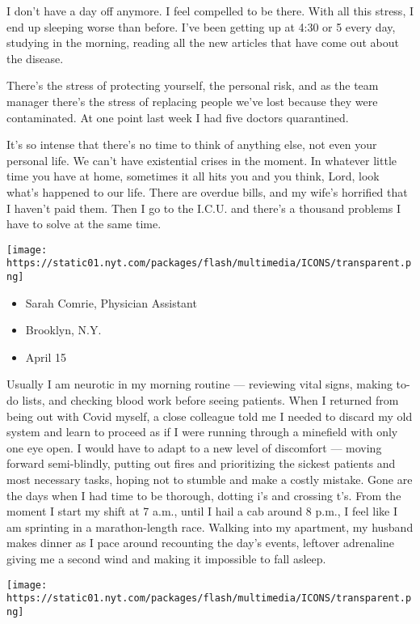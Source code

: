 I don't have a day off anymore. I feel compelled to be there. With all
this stress, I end up sleeping worse than before. I've been getting up
at 4:30 or 5 every day, studying in the morning, reading all the new
articles that have come out about the disease.

There's the stress of protecting yourself, the personal risk, and as the
team manager there's the stress of replacing people we've lost because
they were contaminated. At one point last week I had five doctors
quarantined.

It's so intense that there's no time to think of anything else, not even
your personal life. We can't have existential crises in the moment. In
whatever little time you have at home, sometimes it all hits you and you
think, Lord, look what's happened to our life. There are overdue bills,
and my wife's horrified that I haven't paid them. Then I go to the
I.C.U. and there's a thousand problems I have to solve at the same time.

\texttt{[image: https://static01.nyt.com/packages/flash/multimedia/ICONS/transparent.png]}

\begin{itemize}
\tightlist
\item
  Sarah Comrie, Physician Assistant
\item
  Brooklyn, N.Y.
\item
  April 15
\end{itemize}

Usually I am neurotic in my morning routine --- reviewing vital signs,
making to-do lists, and checking blood work before seeing patients. When
I returned from being out with Covid myself, a close colleague told me I
needed to discard my old system and learn to proceed as if I were
running through a minefield with only one eye open. I would have to
adapt to a new level of discomfort --- moving forward semi-blindly,
putting out fires and prioritizing the sickest patients and most
necessary tasks, hoping not to stumble and make a costly mistake. Gone
are the days when I had time to be thorough, dotting i's and crossing
t's. From the moment I start my shift at 7 a.m., until I hail a cab
around 8 p.m., I feel like I am sprinting in a marathon-length race.
Walking into my apartment, my husband makes dinner as I pace around
recounting the day's events, leftover adrenaline giving me a second wind
and making it impossible to fall asleep.

\texttt{[image: https://static01.nyt.com/packages/flash/multimedia/ICONS/transparent.png]}

